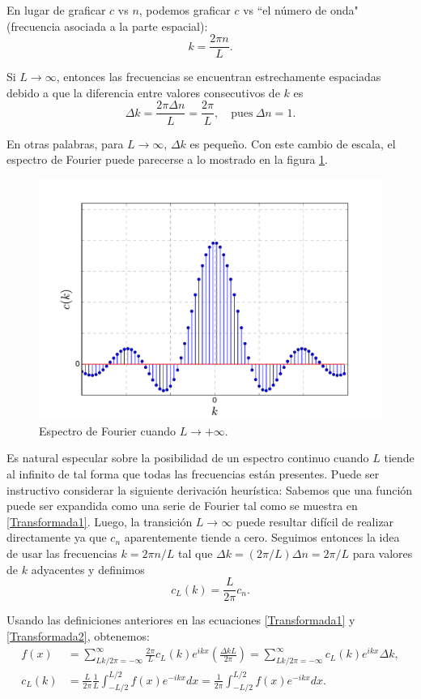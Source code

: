 En lugar de graficar $c$ vs $n$, podemos graficar $c$ vs ``el número de onda" (frecuencia asociada a la parte espacial):
$$k = \frac{2\pi n}{L}.$$

Si $L \to \infty$, entonces las frecuencias se encuentran estrechamente espaciadas debido a que la diferencia entre valores consecutivos de $k$ es
$$\Delta k = \frac{ 2\pi \Delta n}{L}  = \frac{2\pi}{L}, \quad \mbox{pues}~ \Delta n = 1.$$

En otras palabras, para $L \to \infty$, $\Delta k$ es pequeño. Con este cambio de escala, el espectro de Fourier puede parecerse a lo mostrado en la figura \ref{Espectro1}.

\begin{figure}
    \centering
    \includegraphics[scale = 0.4]{Figuras/Espectro2.pdf}    \caption{Espectro de Fourier cuando $L \to + \infty$.}
    \label{Espectro1}
\end{figure}

Es natural especular sobre la posibilidad de un espectro continuo cuando $L$ tiende al infinito  de tal forma que todas las frecuencias están presentes. Puede ser instructivo considerar la siguiente derivación heurística: Sabemos que una función puede ser expandida como una serie de Fourier tal como se muestra en \eqref{Transformada1}. Luego, la transición $L \to \infty$ puede resultar difícil de realizar directamente ya que $c_n$ aparentemente tiende a cero. Seguimos entonces la idea de usar las frecuencias $k = 2\pi n/L$ tal que
$\Delta k = (2\pi/L ) \Delta n = 2\pi/L$ para valores de $k$ adyacentes y definimos
$$c_L(k) = \frac{L}{2 \pi} c_n.$$

Usando las definiciones anteriores en las ecuaciones \eqref{Transformada1} y \eqref{Transformada2}, obtenemos: 
\begin{align*}
    f(x)&= \sum_{Lk/2\pi = -\infty}^{\infty} \frac{2\pi}{L} c_L(k) e^{ikx} \left( \frac{\Delta k L}{2\pi}\right) = \sum_{Lk/2\pi = -\infty}^{\infty}  c_L(k) e^{ikx} \Delta k , \\
  c_L(k) &= \frac{L}{2\pi} \frac{1}{L} \int_{-L/2}^{L/2} f(x) e^{-ikx} dx = \frac{1}{2\pi} \int_{-L/2}^{L/2} f(x) e^{-ikx} dx.
\end{align*}

